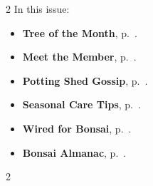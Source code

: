 \setlength{\columnsep}{-5.0cm}
\begin{multicols}{2}
    \noindent\textsf{In this issue:}
    \begin{itemize}
        \item \textsf{\textbf{Tree of the Month}}, p.~\pageref{2025-06-contest}.
        \item \textsf{\textbf{Meet the Member}}, p.~\pageref{2025-06-roots}.
        \item \textsf{\textbf{Potting Shed Gossip}}, p.~\pageref{2025-06-gossip}.
        \item \textsf{\textbf{Seasonal Care Tips}}, p.~\pageref{2025-06-care}.
        \item \textsf{\textbf{Wired for Bonsai}}, p.~\pageref{2025-06-wired}.
        \item \textsf{\textbf{Bonsai Almanac}}, p.~\pageref{2025-06-almanac}.
    \end{itemize}
    \vfill\null
    \columnbreak

    
\end{multicols}
\pagebreak

\setlength{\columnsep}{0.5cm}
\begin{multicols}{2}
    
    
%    
%    
    
    
    
    
    
%    
%    
\end{multicols}
